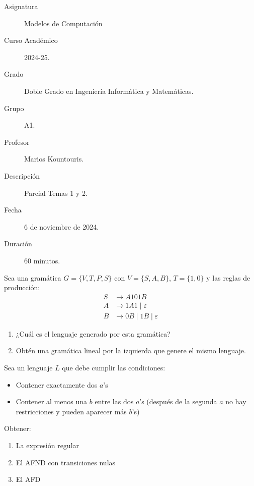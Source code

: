 \documentclass[12pt]{article}
\begin{document}

    
    

    \begin{description}
        \item[Asignatura] Modelos de Computación
        \item[Curso Académico] 2024-25.
        \item[Grado] Doble Grado en Ingeniería Informática y Matemáticas.
        \item[Grupo] A1.
        \item[Profesor] Marios Kountouris.
        \item[Descripción] Parcial Temas 1 y 2.
        \item[Fecha] 6 de noviembre de 2024.
        \item[Duración] 60 minutos.    
    \end{description}
    \newpage

\begin{ejercicio}
    Sea una gramática $G=\{V,T,P,S\}$ con $V=\{S,A,B\}$, $T=\{1,0\}$ y las reglas de producción:
    \begin{align*}
        S & \rightarrow A101B \\
        A & \rightarrow 1A1\mid \varepsilon \\
        B & \rightarrow 0B \mid 1B\mid \varepsilon
    \end{align*}
    \begin{enumerate}
        \item ¿Cuál es el lenguaje generado por esta gramática?
        \item Obtén una gramática lineal por la izquierda que genere el mismo lenguaje.
    \end{enumerate}
\end{ejercicio}

\begin{ejercicio}
    Sea un lenguaje $L$ que debe cumplir las condiciones:
    \begin{itemize}
        \item Contener exactamente dos $a$'s
        \item Contener al menos una $b$ entre las dos $a$'s (después de la segunda $a$ no hay restricciones y pueden aparecer más $b$'s)
    \end{itemize}
    Obtener:
    \begin{enumerate}
        \item La expresión regular
        \item El AFND con transiciones nulas
        \item El AFD
    \end{enumerate}
\end{ejercicio}
\end{document}
